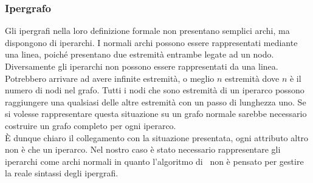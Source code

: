 \subsubsection*{Ipergrafo}
Gli ipergrafi nella loro definizione formale non presentano semplici archi, ma dispongono di iperarchi. I normali archi possono essere rappresentati mediante una linea, poiché presentano due estremità entrambe legate ad un nodo. Diversamente gli iperarchi non possono essere rappresentati da una linea. Potrebbero arrivare ad avere infinite estremità, o meglio $n$ estremità dove $n$ è il numero di nodi nel grafo. Tutti i nodi che sono estremità di un iperarco possono raggiungere una qualsiasi delle altre estremità con un passo di lunghezza uno. Se si volesse rappresentare questa situazione su un grafo normale sarebbe necessario costruire un grafo completo per ogni iperarco.\\
È dunque chiaro il collegamento con la situazione presentata, ogni attributo altro non è che un iperarco. Nel nostro caso è stato necessario rappresentare gli iperarchi come archi normali in quanto l'algoritmo di \nv\ non è pensato per gestire la reale sintassi degli ipergrafi.
%
%
